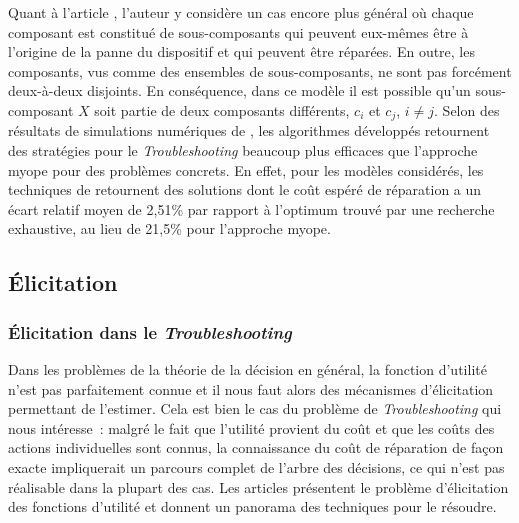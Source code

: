 \documentclass[a4paper,11pt]{article}
\theoremstyle{plain}
\theoremstyle{definition}
\begin{document}
Quant à l'article \cite{Langseth_2003}, l'auteur y considère un cas encore plus général où chaque composant est constitué de sous-composants qui peuvent eux-mêmes être à l'origine de la panne du dispositif et qui peuvent être réparées. En outre, les composants, vus comme des ensembles de sous-composants, ne sont pas forcément deux-à-deux disjoints. En conséquence, dans ce modèle il est possible qu'un sous-composant $X$ soit partie de deux composants différents, $c_i$ et $c_j$, $i \neq j$. Selon des résultats de simulations numériques de \cite{Langseth_2003}, les algorithmes développés retournent des stratégies pour le \emph{Troubleshooting} beaucoup plus efficaces que l'approche myope pour des problèmes concrets. En effet, pour les modèles considérés, les techniques de \cite{Jensen_2001, Langseth_2003} retournent des solutions dont le coût espéré de réparation a un écart relatif moyen de 2,51\% par rapport à l'optimum trouvé par une recherche exhaustive, au lieu de 21,5\% pour l'approche myope.

\subsection{Élicitation}
\label{SecElicitation}

\subsubsection{Élicitation dans le \emph{Troubleshooting}}
\label{SecElicitationTroubleshooting}

Dans les problèmes de la théorie de la décision en général, la fonction d'utilité n'est pas parfaitement connue et il nous faut alors des mécanismes d'élicitation permettant de l'estimer. Cela est bien le cas du problème de \emph{Troubleshooting} qui nous intéresse~: malgré le fait que l'utilité provient du coût et que les coûts des actions individuelles sont connus, la connaissance du coût de réparation de façon exacte impliquerait un parcours complet de l'arbre des décisions, ce qui n'est pas réalisable dans la plupart des cas. Les articles \cite{Braziunas_2008, braziunas_local_2005} présentent le problème d'élicitation des fonctions d'utilité et donnent un panorama des techniques pour le résoudre.
\end{document}
